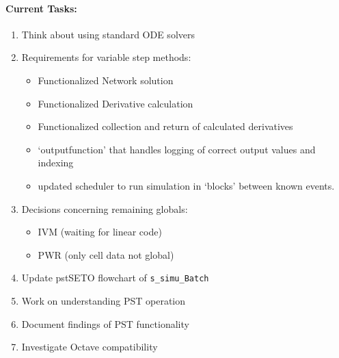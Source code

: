 \documentclass[12pt]{article}
\begin{document}
\begin{multicols}{2}
\paragraph{Current Tasks:}
	\begin{enumerate}
		\itemsep 0em 
		\item Think about using standard ODE solvers
				\item Requirements for variable step methods:
						\begin{minipage}{\linewidth}
							\begin{itemize}
								\itemsep0em 
								\footnotesize
								\item Functionalized Network solution
								\item Functionalized Derivative calculation
								\item Functionalized collection and return of calculated derivatives
								\item `outputfunction' that handles logging of correct output values and indexing
								\item updated scheduler to run simulation in `blocks' between known events.
							\end{itemize}
						\end{minipage}
		\item Decisions concerning remaining globals:
		\begin{minipage}{\linewidth}
						\begin{itemize}
				\itemsep0em 
						\footnotesize
							\item IVM (waiting for linear code)
							\item PWR (only cell data not global)
						\end{itemize}
				\end{minipage}
	
		\item Update pstSETO flowchart of \verb|s_simu_Batch|
		\item Work on understanding PST operation
		\item Document findings of PST functionality
		\item Investigate Octave compatibility
\end{enumerate}




\end{multicols}
\end{document}
